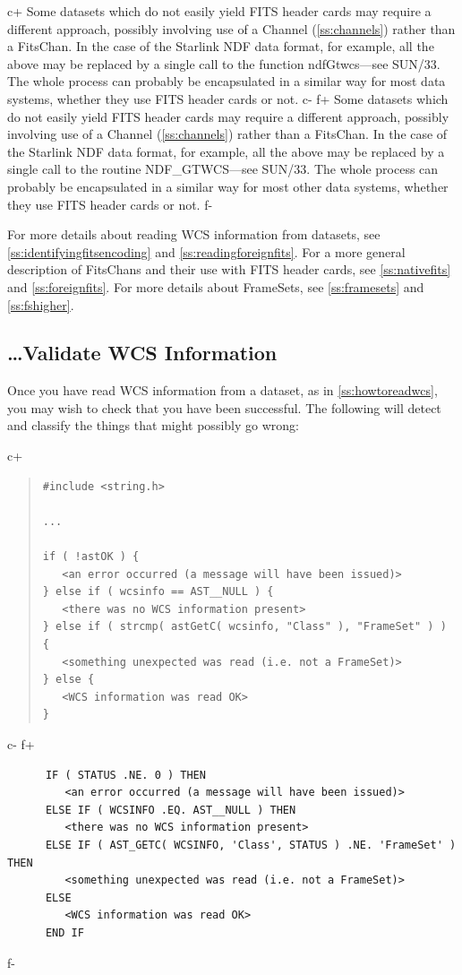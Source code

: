 \documentclass[twoside,11pt]{article}
\newcommand{\xref}[3]{#1}
\newcommand{\secref}[1]{\S\ref{#1}}
\renewcommand{\secref}[1]{\ref{#1}}
\begin{document}
c+
Some datasets which do not easily yield FITS header cards may require
a different approach, possibly involving use of a Channel
(\secref{ss:channels}) rather than a FitsChan. In the case of the
Starlink NDF data format, for example, all the above may be replaced
by a single call to the function
\xref{ndfGtwcs}{sun33}{ndfGtwcs}---see \xref{SUN/33}{sun33}{}.  The
whole process can probably be encapsulated in a similar way for
most data systems, whether they use FITS header cards or not.
c-
f+
Some datasets which do not easily yield FITS header cards may require
a different approach, possibly involving use of a Channel
(\secref{ss:channels}) rather than a FitsChan. In the case of the
Starlink NDF data format, for example, all the above may be replaced
by a single call to the routine
\xref{NDF\_GTWCS}{sun33}{NDF_GTWCS}---see \xref{SUN/33}{sun33}{}.  The
whole process can probably be encapsulated in a similar way for most
other data systems, whether they use FITS header cards or not.
f-

For more details about reading WCS information from datasets, see
\secref{ss:identifyingfitsencoding} and
\secref{ss:readingforeignfits}. For a more general description of
FitsChans and their use with FITS header cards, see
\secref{ss:nativefits} and \secref{ss:foreignfits}. For more details
about FrameSets, see \secref{ss:framesets} and \secref{ss:fshigher}.

\subsection{\ldots Validate WCS Information}

Once you have read WCS information from a dataset, as in
\secref{ss:howtoreadwcs}, you may wish to check that you have been
successful. The following will detect and classify the things that
might possibly go wrong:

c+
\begin{quote}
\small
\begin{verbatim}
#include <string.h>

...

if ( !astOK ) {
   <an error occurred (a message will have been issued)>
} else if ( wcsinfo == AST__NULL ) {
   <there was no WCS information present>
} else if ( strcmp( astGetC( wcsinfo, "Class" ), "FrameSet" ) ) {
   <something unexpected was read (i.e. not a FrameSet)>
} else {
   <WCS information was read OK>
}
\end{verbatim}
\normalsize
\end{quote}
c-
f+
\small
\begin{verbatim}
      IF ( STATUS .NE. 0 ) THEN
         <an error occurred (a message will have been issued)>
      ELSE IF ( WCSINFO .EQ. AST__NULL ) THEN
         <there was no WCS information present>
      ELSE IF ( AST_GETC( WCSINFO, 'Class', STATUS ) .NE. 'FrameSet' ) THEN
         <something unexpected was read (i.e. not a FrameSet)>
      ELSE
         <WCS information was read OK>
      END IF
\end{verbatim}
\normalsize
f-
\end{document}
